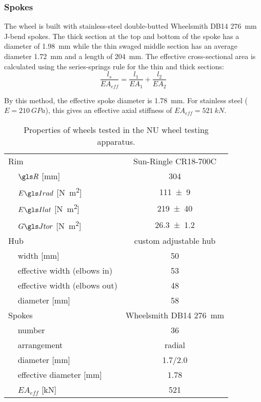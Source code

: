 \documentclass[../../thesis.tex]{subfiles}
\begin{document}
\subsubsection*{Spokes}
The wheel is built with stainless-steel double-butted Wheelsmith DB14 \SI{276}{mm} J-bend spokes. The thick section at the top and bottom of the spoke has a diameter of \SI{1.98}{mm} while the thin swaged middle section has an average diameter \SI{1.72}{mm} and a length of \SI{204}{mm}. The effective cross-sectional area is calculated using the series-springs rule for the thin and thick sections:
\begin{equation}
\frac{l_s}{EA_{eff}} = \frac{l_1}{EA_1} + \frac{l_2}{EA_2}
\end{equation}

By this method, the effective spoke diameter is \SI{1.78}{mm}. For stainless steel ($E = \SI{210}{GPa}$), this gives an effective axial stiffness of $EA_{eff} = \SI{521}{kN}$.

\begin{table}
\caption{Properties of wheels tested in the NU wheel testing apparatus.}
\label{tab:rad_buckling_wheels}
\begin{tabular}{llc}
\hline
\multicolumn{2}{l}{Rim}& Sun-Ringle CR18-700C\\
\,& $\R$ [\si{mm}]         & \num{304}\\
\,& $\EIr$ [\si{N.m^2}]    & \num{111+-9}\\
\,& $\EIl$ [\si{N.m^2}]    & \num{219+-40}\\
\,& $\GJ$   [\si{N.m^2}]   & \num{26.3+-1.2}\\
\multicolumn{2}{l}{Hub}    & custom adjustable hub\\
\,& width [\si{mm}]        & 50\\
\,& effective width (elbows in) & 53\\
\,& effective width (elbows out) & 48\\
\,& diameter [\si{mm}]     & 58\\
\multicolumn{2}{l}{Spokes} & Wheelsmith DB14 \SI{276}{mm}\\
\,& number                 & 36\\
\,& arrangement            & radial\\
\,& diameter [\si{mm}]     & 1.7/2.0\\
\,& effective diameter [\si{mm}] & 1.78\\
\,& $EA_{eff}$ [\si{kN}]   & 521\\
\hline
\end{tabular}
\end{table}
\end{document}
